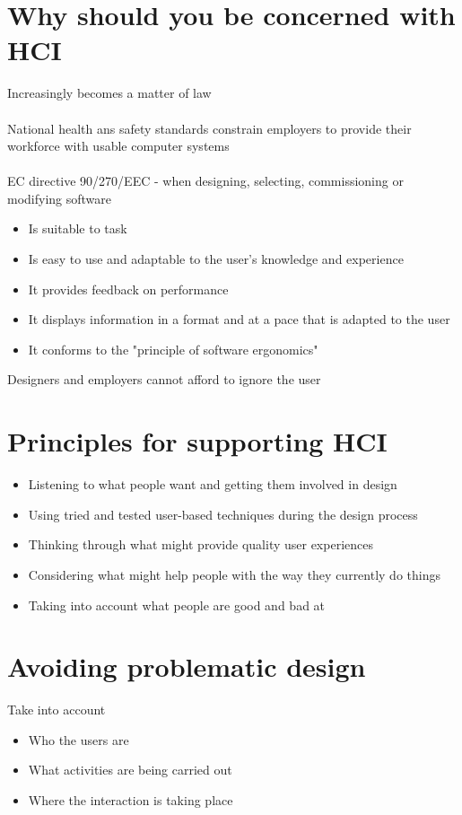 \documentclass{article}[18pt]
\begin{document}
\section{Why should you be concerned with HCI}
Increasingly becomes a matter of law\\
\\
National health ans safety standards constrain employers to provide their workforce with usable computer systems\\
\\
EC directive 90/270/EEC - when designing, selecting, commissioning or modifying software
\begin{itemize}
	\item Is suitable to task
	\item Is easy to use and adaptable to the user's knowledge and experience
	\item It provides feedback on performance
	\item It displays information in a format and at a pace that is adapted to the user
	\item It conforms to the "principle of software ergonomics"
\end{itemize}
Designers and employers cannot afford to ignore the user
\section{Principles for supporting HCI}
\begin{itemize}
	\item Listening to what people want and getting them involved in design
	\item Using tried and tested user-based techniques during the design process
	\item Thinking through what might provide quality user experiences
	\item Considering what might help people with the way they currently do things
	\item Taking into account what people are good and bad at
\end{itemize}
\section{Avoiding problematic design}
Take into account
\begin{itemize}
	\item Who the users are
	\item What activities are being carried out
	\item Where the interaction is taking place
\end{itemize}
\end{document}
